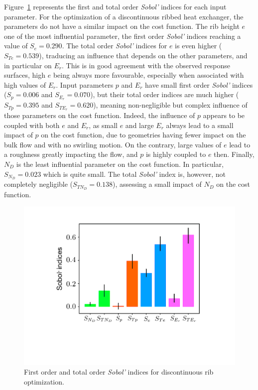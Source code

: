 Figure~\ref{sensitivity} represents the first and total order \emph{Sobol'} indices for each input parameter. For the optimization of a discontinuous ribbed heat exchanger, the parameters do not have a similar impact on the cost function. The rib height $e$ one of the most influential parameter, the first order \emph{Sobol'} indices reaching a value of $S_e = 0.290$. The total order \emph{Sobol'} indices for $e$ is even higher ($S_{Te} = 0.539$), traducing an influence that depends on the other parameters, and in particular on $E_r$. This is in good agreement with the observed response surfaces, high $e$ being always more favourable, especially when associated with high values of $E_r$. Input parameters $p$ and $E_r$ have small first order \emph{Sobol'} indices ($S_p = 0.006$ and $S_{E_r} = 0.070$), but their total order indices are much higher ($S_{Tp} = 0.395$ and $S_{TE_r} = 0.620$), meaning non-negligible but complex influence of those parameters on the cost function. Indeed, the influence of $p$ appears to be coupled with both $e$ and $E_r$, as small $e$ and large $E_r$ always lead to a small impact of $p$ on the cost function, due to geometries having fewer impact on the bulk flow and with no swirling motion. On the contrary, large values of $e$ lead to a roughness greatly impacting the flow, and $p$ is highly coupled to $e$ then. Finally, $N_D$ is the least influential parameter on the cost function. In particular, $S_{N_D} = 0.023$ which is quite small. The total \emph{Sobol'} index is, however, not completely negligible ($S_{TN_D} = 0.138$), assessing a small impact of $N_D$ on the cost function.

\begin{figure}[!ht]
\centering
\includegraphics[width=0.6\linewidth,keepaspectratio]{fig/applications/optim/Sobol_discontinu.pdf}
\caption{First order and total order \emph{Sobol'} indices for discontinuous rib optimization.}
\label{sensitivity}
\end{figure}

